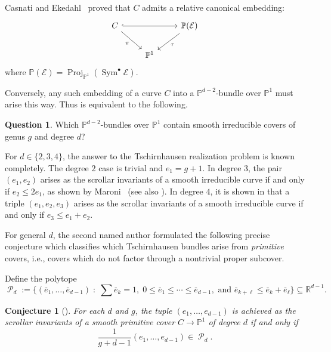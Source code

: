 \documentclass[11pt]{amsart}
\numberwithin{theorem}{section}
\numberwithin{equation}{section}
\newtheorem{conjecture}[theorem]{Conjecture}
\theoremstyle{definition}\newtheorem{defn}[theorem]{Definition}
\theoremstyle{definition}\newtheorem{remark}[theorem]{Remark}
\theoremstyle{definition}\newtheorem{question}[theorem]{Question}
\theoremstyle{definition}\newtheorem{problem}[theorem]{Problem}
\newcommand{\RR}{\mathbb{R}}
\newcommand{\PP}{\mathbb{P}}
\newcommand{\cE}{\mathcal{E}}
\DeclareMathOperator{\Proj}{Proj}
\DeclareMathOperator{\Sym}{Sym}
\DeclareMathOperator{\polytope}{\mathcal{P}}
\renewcommand{\subset}{\subseteq}
\begin{document}
Casnati and Ekedahl~\cite[Theorem 1.3]{CE} proved that $C$ admits a relative canonical embedding:
\[\begin{tikzcd}
	C && \PP(\cE) \\
	& \PP^1
	\arrow[hook, from=1-1, to=1-3]
	\arrow["\pi"', from=1-1, to=2-2]
	\arrow["\tau", from=1-3, to=2-2]
\end{tikzcd}
\]
where $\PP(\cE) = \Proj_{\PP^1} (\Sym^\bullet \cE)$.

Conversely, any such embedding of a curve $C$ into a $\PP^{d-2}$-bundle over $\PP^1$ must arise this way. Thus  is equivalent to the following.

\begin{question}
\label{q:main-alt}
Which $\PP^{d-2}$-bundles over $\PP^1$ contain smooth irreducible covers of genus $g$ and degree $d$?
\end{question}

For $d \in \{2,3,4\}$, the answer to the Tschirnhausen realization problem is known completely. The degree $2$ case is trivial and $e_1 = g+1$. In degree $3$, the pair $(e_1,e_2)$ arises as the scrollar invariants of a smooth irreducible curve if and only if $e_2 \leq 2e_1$, as shown by Maroni~\cite[Section~3]{maroni} (see also \cite[Section~2.2]{VV}). In degree $4$, it is shown in \cite[Theorem~3.1]{VV} that a triple $(e_1,e_2,e_3)$ arises as the scrollar invariants of a smooth irreducible curve if and only if $e_3 \leq e_1 + e_2$. 

For general $d$, the second named author formulated the following precise conjecture which classifies which Tschirnhausen bundles arise from \emph{primitive} covers, i.e., covers which do not factor through a nontrivial proper subcover. 

Define the polytope 
\begin{equation}\label{eq:V}
\polytope_d := \Big\{ (\overline{e}_1,\dots,\overline{e}_{d-1}) \;  : \; \sum \overline{e}_k = 1,  \;  0 \leq \overline{e}_1 \leq \cdots \leq \overline{e}_{d-1},
\text{ and }\overline{e}_{k + \ell} \leq \overline{e}_k + \overline{e}_\ell \Big\} \subset \RR^{d-1}.
\end{equation}

\begin{conjecture}[{\cite[Conjecture~1.3]{VV}}]
\label{conj:tschirnhausen}
For each $d$ and $g$, the tuple $(e_1,\dots,e_{d-1})$ is achieved as the scrollar invariants of a smooth primitive cover $C \to \PP^1$ of degree $d$ if and only if
\[
    \frac{1}{g + d-1}(e_1,\dots,e_{d-1}) \in \polytope_d.
\]
\end{conjecture}
\end{document}
